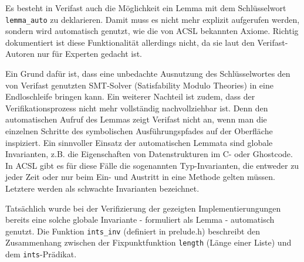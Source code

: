 

Es besteht in Verifast auch die Möglichkeit ein Lemma mit dem Schlüsselwort \lstinline{lemma_auto} zu deklarieren.
Damit muss es nicht mehr explizit aufgerufen werden, sondern wird automatisch genutzt, wie die von 
ACSL bekannten Axiome. Richtig dokumentiert ist diese Funktionalität allerdings nicht, da sie laut den Verifast-Autoren
nur für Experten gedacht ist. 

Ein Grund dafür ist, dass eine unbedachte Ausnutzung des Schlüsselwortes
den von Verifast genutzten SMT-Solver (Satisfability Modulo Theories) in eine Endloschleife bringen kann. Ein
weiterer Nachteil ist zudem, dass der Verifikationsprozess nicht mehr vollständig nachvollziehbar ist.
Denn den automatischen Aufruf des Lemmas zeigt Verifast nicht an, wenn man die einzelnen
Schritte des symbolischen Ausführungspfades auf der Oberfläche inspiziert.
\newline
\newline
Ein sinnvoller Einsatz der automatischen Lemmata sind globale Invarianten, z.B. die Eigenschaften von Datenstrukturen
im C- oder Ghostcode. In ACSL gibt es für diese Fälle die sogenannten Typ-Invarianten, die entweder zu jeder Zeit oder
nur beim Ein- und Austritt in eine Methode gelten müssen. Letztere werden als schwachte Invarianten bezeichnet.

Tatsächlich wurde bei der Verifizierung der gezeigten Implementierungungen bereits eine solche
globale Invariante - formuliert als Lemma - automatisch genutzt. Die Funktion \lstinline{ints_inv}
(definiert in prelude.h) beschreibt den Zusammenhang zwischen der Fixpunktfunktion \texttt{length}
(Länge einer Liste) und dem \lstinline{ints}-Prädikat.



